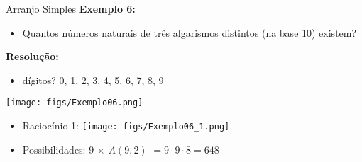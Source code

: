 \documentclass[aspectratio=169]{beamer}
\begin{document}
\begin{frame}{Arranjo Simples}
    \textbf{Exemplo 6:}
    \vspace{2mm}

    \begin{itemize}
        \item[] Quantos números naturais de três algarismos distintos (na base 10) existem?
    \end{itemize}

    \vspace{2mm}
    \pause
    \textbf{Resolução:}
    
    \begin{itemize}
        \item dígitos? 0, 1, 2, 3, 4, 5, 6, 7, 8, 9 \pause
    \end{itemize}

    \begin{center}
        \texttt{[image: figs/Exemplo06.png]}
    \end{center}

    \vspace{4mm}

    \begin{itemize}
        \item[] Raciocínio 1: \hspace{2.2cm} \texttt{[image: figs/Exemplo06\_1.png]}
        \item[] Possibilidades: \hspace{2.2cm} $9$ \hspace{0.2cm} $\times$ \hspace{0.4cm} $A(9,2)$ $ = 9 \cdot 9 \cdot 8 = 648$ 
    \end{itemize}
    
\end{frame}
\end{document}
